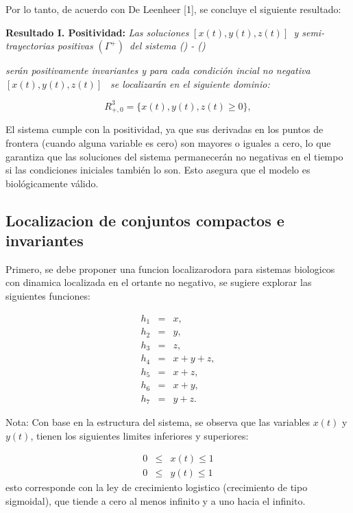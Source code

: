\documentclass[letterpaper,11pt]{article}
\begin{document}
Por lo tanto, de acuerdo con De Leenheer [1], se concluye el siguiente
resultado:

\textbf{Resultado I. Positividad: }\textit{Las soluciones }$[x\left(
t\right) ,y\left( t\right) ,z\left( t\right) ]$\textit{\ y semi-trayectorias
positivas }$\left( \Gamma ^{+}\right) $\textit{\ del sistema () - ()\newline
}

\textit{ser\'{a}n positivamente invariantes y para cada condici\'{o}n incial
no negativa }$[x\left( t\right) ,y\left( t\right) ,z\left( t\right) ]$%
\textit{\ se localizar\'{a}n en el siguiente dominio:\ }

\begin{equation*}
R_{+,0}^{3}=\{x(t),y(t),z(t)\geqslant 0\},
\end{equation*}

El sistema cumple con la positividad, ya que sus derivadas en los puntos de
frontera (cuando alguna variable es cero) son mayores o iguales a cero, lo
que garantiza que las soluciones del sistema permanecer\'{a}n no negativas
en el tiempo si las condiciones iniciales tambi\'{e}n lo son. Esto asegura
que el modelo es biol\'{o}gicamente v\'{a}lido.

\subsection{Localizacion de conjuntos compactos e invariantes}

Primero, se debe proponer una funcion localizarodora para sistemas
biologicos con dinamica localizada en el ortante no negativo, se sugiere
explorar las siguientes funciones:

\begin{eqnarray*}
h_{1} &=&x, \\
h_{2} &=&y, \\
h_{3} &=&z, \\
h_{4} &=&x+y+z, \\
h_{5} &=&x+z, \\
h_{6} &=&x+y, \\
h_{7} &=&y+z.
\end{eqnarray*}

Nota: Con base en la estructura del sistema, se observa que las variables $%
x(t)$ y $y\left( t\right) $, tienen los siguientes limites inferiores y
superiores:

\begin{eqnarray*}
0 &\leq &x\left( t\right) \leq 1 \\
0 &\leq &y\left( t\right) \leq 1
\end{eqnarray*}%
esto corresponde con la ley de crecimiento logistico (crecimiento de tipo
sigmoidal), que tiende a cero al menos infinito y a uno hacia el infinito.
\end{document}
